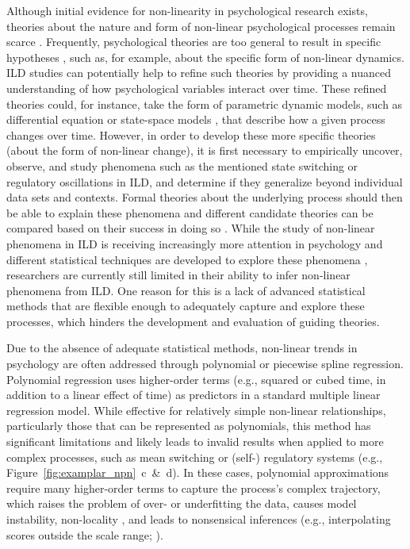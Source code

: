 \documentclass[man, floatsintext]{apa7}
\begin{document}
Although initial evidence for non-linearity in psychological research exists,
theories about the nature and form of non-linear psychological processes remain
scarce \parencite{tan_time-varying_2011}. Frequently, psychological theories
are too general to result in specific hypotheses
\parencite{oberauer_addressing_2019}, such as, for example, about the specific
form of non-linear dynamics. ILD studies can potentially help to refine such
theories by providing a nuanced understanding of how psychological variables
interact over time. These refined theories could, for instance, take the form
of parametric dynamic models, such as differential equation
\parencite{cooper_dynamical_2012} or state-space models
\parencite{durbin_time_2012}, that describe how a given process changes over
time. However, in order to develop these more specific theories (about the form
of non-linear change), it is first necessary to empirically uncover, observe,
and study phenomena such as the mentioned state switching or regulatory
oscillations in ILD, and determine if they generalize beyond individual data
sets and contexts. Formal theories about the underlying process should then be
able to explain these phenomena and different candidate theories can be
compared based on their success in doing so \parencite{borsboom_theory_2021}.
While the study of non-linear phenomena in ILD is receiving increasingly more
attention in psychology and different statistical techniques are developed to
explore these phenomena \parencite{cui_unlocking_2023,humberg_estimating_2024},
researchers are currently still limited in their ability to infer non-linear
phenomena from ILD\@. One reason for this is a lack of advanced statistical
methods that are flexible enough to adequately capture and explore these
processes, which hinders the development and evaluation of guiding theories.

Due to the absence of adequate statistical methods, non-linear trends in
psychology are often addressed through polynomial or piecewise spline
regression. Polynomial regression \parencite{jebb_time_2015} uses higher-order
terms (e.g., squared or cubed time, in addition to a linear effect of time) as
predictors in a standard multiple linear regression model. While effective for
relatively simple non-linear relationships, particularly those that can be
represented as polynomials, this method has significant limitations and likely
leads to invalid results when applied to more complex processes, such as mean
switching or (self-) regulatory systems (e.g.,
Figure~\ref{fig:examplar_npn}~c~\&~d). In these cases, polynomial
approximations require many higher-order terms to capture the process's complex
trajectory, which raises the problem of over- or underfitting the data, causes
model instability, non-locality \parencite{magee_nonlocal_1998}, and leads to
nonsensical inferences (e.g., interpolating scores outside the scale range;
\textcite{boyd_divergence_2009,harrell_general_2001,jianan_case_2023}).
\end{document}
